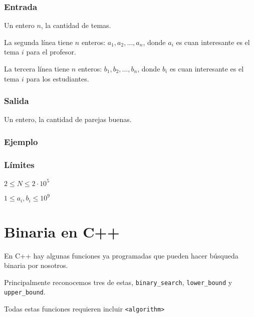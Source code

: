 \subsubsection*{Entrada}
Un entero \(n\), la cantidad de temas.

La segunda línea tiene \(n\) enteros: \(a_1,a_2,\ldots, a_n\), donde \(a_i\) es cuan interesante es el tema \(i\) para el profesor.

La tercera línea tiene \(n\) enteros: \(b_1,b_2,\ldots, b_n\), donde \(b_i\) es cuan interesante es el tema \(i\) para los estudiantes.

\subsubsection*{Salida}
Un entero, la cantidad de parejas buenas.

\subsubsection*{Ejemplo}
\begin{casebox2}
\end{casebox2}

\subsubsection*{Límites}
\begin{plimits}
	\item \(2\leq N\leq 2\cdot 10^5\)
	\item \(1\leq a_i, b_i\leq  10^9\)
\end{plimits}
\codeforces


\problembreak
\newpage
\section*{Binaria en C++}
En C++ hay algunas funciones ya programadas que pueden hacer búsqueda binaria por nosotros.

Principalmente reconocemos tres de estas, \verb|binary_search|, \verb|lower_bound| y \verb|upper_bound|.

Todas estas funciones requieren incluir \verb|<algorithm>|
